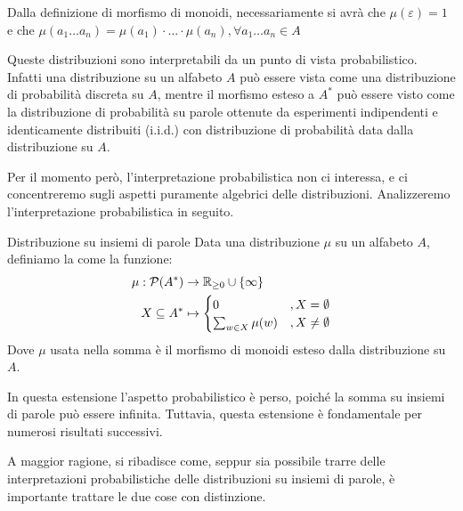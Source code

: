 Dalla definizione di morfismo di monoidi, necessariamente si avrà che \(\mu(\varepsilon) = 1\) e che \(\mu(a_1\ldots a_n) = \mu(a_1)\cdot\ldots\cdot \mu(a_n), \forall a_1\ldots a_n \in A\)

\begin{note}{}
  Queste distribuzioni sono interpretabili da un punto di vista probabilistico.
  Infatti una distribuzione su un alfabeto \(A\) può essere vista come una distribuzione di probabilità discreta su \(A\),
  mentre il morfismo esteso a \(A^*\) può essere visto come la distribuzione di probabilità su parole ottenute da esperimenti indipendenti e identicamente distribuiti (i.i.d.) con distribuzione di probabilità data dalla distribuzione su \(A\).
  
  Per il momento però, l'interpretazione probabilistica non ci interessa, e ci concentreremo sugli aspetti puramente algebrici delle distribuzioni.
  Analizzeremo l'interpretazione probabilistica in seguito.
\end{note}

\begin{definition}{Distribuzione su insiemi di parole}
  Data una distribuzione \(\mu\) su un alfabeto \(A\), definiamo la  come la funzione:
  \begin{equation*}
    \begin{aligned}
      \mu: \mathcal{P}(A^*) &\to \R_{\geq 0} \cup \set{\infty} \\
                  X \subseteq A^* &\mapsto \begin{cases}
                      0 & ,X = \emptyset \\
                      \sum_{w \in X} \mu(w) & ,X \neq \emptyset
                    \end{cases}
    \end{aligned}
  \end{equation*}
  Dove \(\mu\) usata nella somma è il morfismo di monoidi esteso dalla distribuzione su \(A\).  
\end{definition}

\begin{note}{}
  In questa estensione l'aspetto probabilistico è perso, poiché la somma su insiemi di parole può essere infinita.
  Tuttavia, questa estensione è fondamentale per numerosi risultati successivi.

  A maggior ragione, si ribadisce come, seppur sia possibile trarre delle interpretazioni probabilistiche delle distribuzioni su insiemi di parole, è importante trattare le due cose con distinzione.
\end{note}

